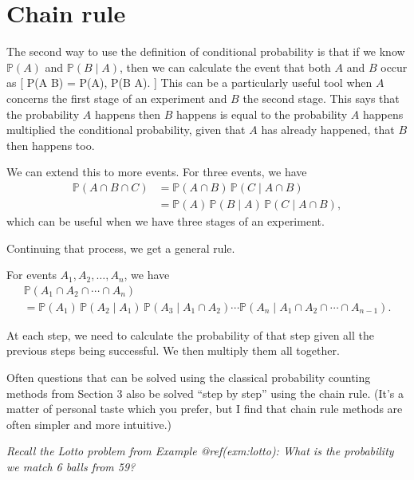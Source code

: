 \documentclass[
  letterpaper,
  DIV=11,
  numbers=noendperiod]{scrreprt}
\theoremstyle{remark}
\begin{document}
\hypertarget{chain-rule}{%
\section{Chain rule}\label{chain-rule}}

The second way to use the definition of conditional probability is that
if we know \(\mathbb P(A)\) and \(\mathbb P(B \mid A)\), then we can
calculate the event that both \(A\) and \(B\) occur as {[} \mathbb P(A
\cap B) = \mathbb P(A), \mathbb P(B \mid A). {]} This can be a
particularly useful tool when \(A\) concerns the first stage of an
experiment and \(B\) the second stage. This says that the probability
\(A\) happens then \(B\) happens is equal to the probability \(A\)
happens multiplied the conditional probability, given that \(A\) has
already happened, that \(B\) then happens too.

We can extend this to more events. For three events, we have
\begin{align*}
\mathbb P(A \cap B \cap C)
  &= \mathbb P(A \cap B) \, \mathbb P(C \mid A \cap B) \\
  &= \mathbb P(A) \, \mathbb P(B \mid A)\, \mathbb P(C \mid A \cap B) ,
\end{align*} which can be useful when we have three stages of an
experiment.

Continuing that process, we get a general rule.

\leavevmode{}%
For events \(A_1, A_2, \dots, A_n\), we have
\begin{multline*}  \mathbb P(A_1 \cap A_2 \cap \cdots \cap A_n) \\
  = \mathbb P(A_1) \, \mathbb P(A_2 \mid A_1) \, \mathbb P(A_3 \mid A_1 \cap A_2) \cdots \mathbb P(A_n \mid A_1 \cap A_2 \cap \cdots \cap  A_{n-1}) .\end{multline*}

At each step, we need to calculate the probability of that step given
all the previous steps being successful. We then multiply them all
together.

Often questions that can be solved using the classical probability
counting methods from Section 3 also be solved ``step by step'' using
the chain rule. (It's a matter of personal taste which you prefer, but I
find that chain rule methods are often simpler and more intuitive.)

\emph{Recall the Lotto problem from Example @ref(exm:lotto): What is the
probability we match 6 balls from 59?}
\end{document}
